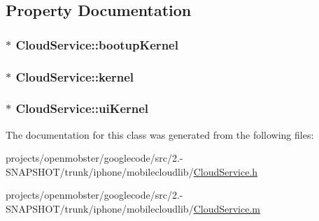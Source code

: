 \subsection{\-Property \-Documentation}
\hypertarget{interface_cloud_service_a5536a0a403267123daf2f067c4bf1a0c}{
\subsubsection[{bootup\-Kernel}]{ $\ast$ \-Cloud\-Service\-::bootup\-Kernel}}
\label{interface_cloud_service_a5536a0a403267123daf2f067c4bf1a0c}
\hypertarget{interface_cloud_service_a7f7e9e2447b17386b0feaeffefa7feb1}{
\subsubsection[{kernel}]{ $\ast$ \-Cloud\-Service\-::kernel}}
\label{interface_cloud_service_a7f7e9e2447b17386b0feaeffefa7feb1}
\hypertarget{interface_cloud_service_ae5dd6329209934db41aedacffb209663}{
\subsubsection[{ui\-Kernel}]{ $\ast$ \-Cloud\-Service\-::ui\-Kernel}}
\label{interface_cloud_service_ae5dd6329209934db41aedacffb209663}


\-The documentation for this class was generated from the following files\-:\begin{DoxyCompactItemize}
\item 
projects/openmobster/googlecode/src/2.-\/\-S\-N\-A\-P\-S\-H\-O\-T/trunk/iphone/mobilecloudlib/\hyperlink{_cloud_service_8h}{\-Cloud\-Service.\-h}\item 
projects/openmobster/googlecode/src/2.-\/\-S\-N\-A\-P\-S\-H\-O\-T/trunk/iphone/mobilecloudlib/\hyperlink{_cloud_service_8m}{\-Cloud\-Service.\-m}\end{DoxyCompactItemize}
